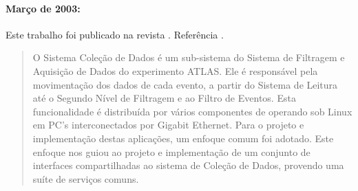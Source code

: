 



\paragraph{Março de 2003: } Este
trabalho foi publicado na revista . Referência \cite{aa:rt-2003}.

\begin{quotation}
O Sistema Coleção de Dados é um sub-sistema do Sistema de Filtragem e
Aquisição de Dados do experimento ATLAS. Ele é responsável pela movimentação
dos dados de cada evento, a partir do Sistema de Leitura até o Segundo Nível
de Filtragem e ao Filtro de Eventos. Esta funcionalidade é distribuída por
vários componentes de  operando sob Linux em PC's
interconectados por Gigabit Ethernet. Para o projeto e implementação destas
aplicações, um enfoque comum foi adotado. Este enfoque nos guiou ao projeto e
implementação de um conjunto de interfaces compartilhadas ao sistema de
Coleção de Dados, provendo uma suíte de serviços comuns.
\end{quotation}

